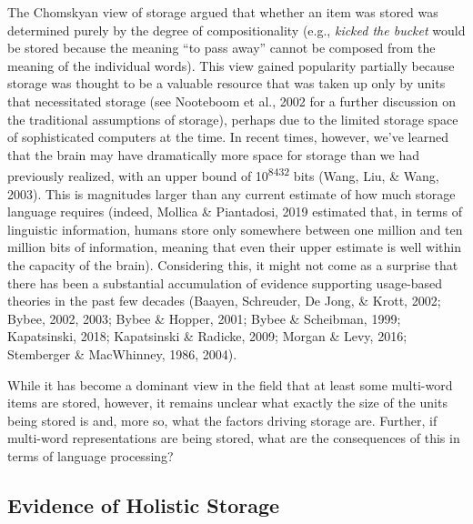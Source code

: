 \documentclass[
  man,floatsintext]{apa6}
\begin{document}
The Chomskyan view of storage argued that whether an item was stored was determined purely by the degree of compositionality (e.g., \emph{kicked the bucket} would be stored because the meaning ``to pass away'' cannot be composed from the meaning of the individual words). This view gained popularity partially because storage was thought to be a valuable resource that was taken up only by units that necessitated storage (see Nooteboom et al., 2002 for a further discussion on the traditional assumptions of storage), perhaps due to the limited storage space of sophisticated computers at the time. In recent times, however, we've learned that the brain may have dramatically more space for storage than we had previously realized, with an upper bound of 10\textsuperscript{8432} bits (Wang, Liu, \& Wang, 2003). This is magnitudes larger than any current estimate of how much storage language requires (indeed, Mollica \& Piantadosi, 2019 estimated that, in terms of linguistic information, humans store only somewhere between one million and ten million bits of information, meaning that even their upper estimate is well within the capacity of the brain). Considering this, it might not come as a surprise that there has been a substantial accumulation of evidence supporting usage-based theories in the past few decades (Baayen, Schreuder, De Jong, \& Krott, 2002; Bybee, 2002, 2003; Bybee \& Hopper, 2001; Bybee \& Scheibman, 1999; Kapatsinski, 2018; Kapatsinski \& Radicke, 2009; Morgan \& Levy, 2016; Stemberger \& MacWhinney, 1986, 2004).

While it has become a dominant view in the field that at least some multi-word items are stored, however, it remains unclear what exactly the size of the units being stored is and, more so, what the factors driving storage are. Further, if multi-word representations are being stored, what are the consequences of this in terms of language processing?

\subsection{Evidence of Holistic Storage}\label{evidence-of-holistic-storage}
\end{document}
